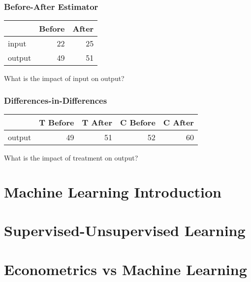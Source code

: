 \documentclass[mathserif, xcolor=table, svgnames]{beamer}
\begin{document}
\begin{frame}
  \frametitle{Before-After Estimator}
  \begin{center}
    \begin{tabular}{lrr}
      \toprule
      & Before & After \\
      \midrule
      input  & 22 & 25 \\
      output & 49 & 51 \\
      \bottomrule
    \end{tabular}
  \end{center}
  What is the impact of input on output?
\end{frame}

\begin{frame}
  \frametitle{Differences-in-Differences}
  \begin{center}
    \begin{tabular}{lrrrr}
      \toprule
      & T Before & T After & C Before & C After \\
      \midrule
      output & 49 & 51 & 52 & 60\\
      \bottomrule
    \end{tabular}
  \end{center}
  What is the impact of treatment on output?  
\end{frame}

\section[Intro]{Machine Learning Introduction}
\frame{\tableofcontents[currentsection]}

{

}

\section[Supervised]{Supervised-Unsupervised Learning}
\frame{\tableofcontents[currentsection]}

{

}

\section['metrics vs ML]{Econometrics vs Machine Learning}
\frame{\tableofcontents[currentsection]}

{

}
\end{document}
